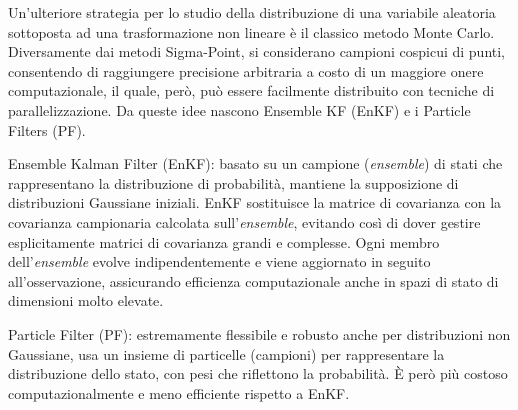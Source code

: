 \documentclass[12pt,a4paper,openright,twoside]{book}
\begin{document}
Un'ulteriore strategia per lo studio della distribuzione di una variabile aleatoria sottoposta ad una trasformazione non lineare è il classico metodo Monte Carlo. Diversamente dai metodi Sigma-Point, si considerano campioni cospicui di punti, consentendo di raggiungere precisione arbitraria a costo di un maggiore onere computazionale, il quale, però, può essere facilmente distribuito con tecniche di parallelizzazione. Da queste idee nascono Ensemble KF (EnKF) e i Particle Filters (PF).

Ensemble Kalman Filter (EnKF): basato su un campione (\textit{ensemble}) di stati che rappresentano la distribuzione di probabilità, mantiene la supposizione di distribuzioni Gaussiane iniziali. EnKF sostituisce la matrice di covarianza con la covarianza campionaria calcolata sull'\textit{ensemble}, evitando così di dover gestire esplicitamente matrici di covarianza grandi e complesse. Ogni membro dell'\textit{ensemble} evolve indipendentemente e viene aggiornato in seguito all'osservazione, assicurando efficienza computazionale anche in spazi di stato di dimensioni molto elevate.

Particle Filter (PF): estremamente flessibile e robusto anche per distribuzioni non Gaussiane, usa un insieme di particelle (campioni) per rappresentare la distribuzione dello stato, con pesi che riflettono la probabilità. È però più costoso computazionalmente e meno efficiente rispetto a EnKF.
\end{document}
